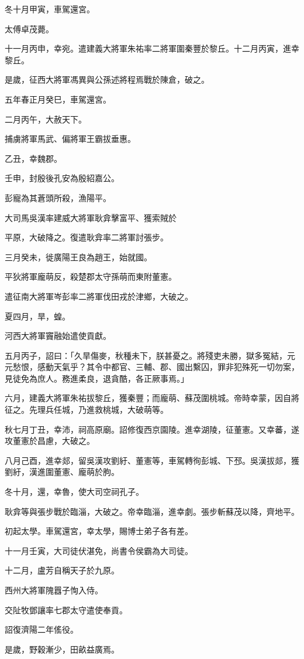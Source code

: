 \begin{pinyinscope}
冬十月甲寅，車駕還宮。

太傅卓茂薨。

十一月丙申，幸宛。遣建義大將軍朱祐率二將軍圍秦豐於黎丘。十二月丙寅，進幸黎丘。

是歲，征西大將軍馮異與公孫述將程焉戰於陳倉，破之。

五年春正月癸巳，車駕還宮。

二月丙午，大赦天下。

捕虜將軍馬武、偏將軍王霸拔垂惠。

乙丑，幸魏郡。

壬申，封殷後孔安為殷紹嘉公。

彭寵為其蒼頭所殺，漁陽平。

大司馬吳漢率建威大將軍耿弇擊富平、獲索賊於

平原，大破降之。復遣耿弇率二將軍討張步。

三月癸未，徙廣陽王良為趙王，始就國。

平狄將軍龐萌反，殺楚郡太守孫萌而東附董憲。

遣征南大將軍岑彭率二將軍伐田戎於津鄉，大破之。

夏四月，旱，蝗。

河西大將軍竇融始遣使貢獻。

五月丙子，詔曰：「久旱傷麥，秋種未下，朕甚憂之。將殘吏未勝，獄多冤結，元元愁恨，感動天氣乎？其令中都官、三輔、郡、國出繫囚，罪非犯殊死一切勿案，見徒免為庶人。務進柔良，退貪酷，各正厥事焉。」

六月，建義大將軍朱祐拔黎丘，獲秦豐；而龐萌、蘇茂圍桃城。帝時幸蒙，因自將征之。先理兵任城，乃進救桃城，大破萌等。

秋七月丁丑，幸沛，祠高原廟。詔修復西京園陵。進幸湖陵，征董憲。又幸蕃，遂攻董憲於昌慮，大破之。

八月己酉，進幸郯，留吳漢攻劉紆、董憲等，車駕轉徇彭城、下邳。吳漢拔郯，獲劉紆，漢進圍董憲、龐萌於朐。

冬十月，還，幸魯，使大司空祠孔子。

耿弇等與張步戰於臨淄，大破之。帝幸臨淄，進幸劇。張步斬蘇茂以降，齊地平。

初起太學。車駕還宮，幸太學，賜博士弟子各有差。

十一月壬寅，大司徒伏湛免，尚書令侯霸為大司徒。

十二月，盧芳自稱天子於九原。

西州大將軍隗囂子恂入侍。

交阯牧鄧讓率七郡太守遣使奉貢。

詔復濟陽二年傜役。

是歲，野穀漸少，田畝益廣焉。


\end{pinyinscope}